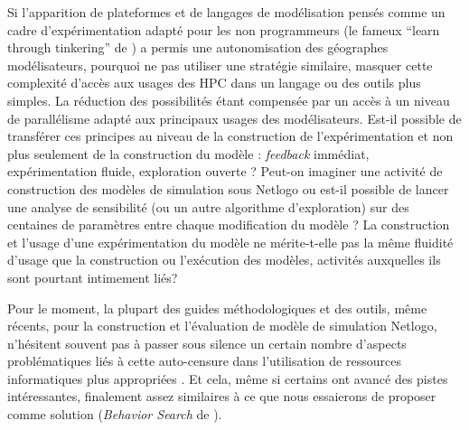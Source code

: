 
Si l'apparition de plateformes et de langages de modélisation pensés comme un cadre d'expérimentation adapté pour les non programmeurs (le fameux \foreignquote{english}{learn through tinkering} de \textcite{Resnick2013}) a permis une autonomisation des géographes modélisateurs, pourquoi ne pas utiliser une stratégie similaire, masquer cette complexité d'accès aux usages des HPC dans un langage ou des outils plus simples. La réduction des possibilités étant  compensée par un accès à un niveau de parallélisme adapté aux principaux usages des modélisateurs. Est-il possible de transférer ces principes au niveau de la construction de l'expérimentation et non plus seulement de la construction du modèle : \textit{feedback} immédiat, expérimentation fluide, exploration ouverte ? Peut-on imaginer une activité de construction des modèles de simulation sous Netlogo ou est-il possible de lancer une analyse de sensibilité (ou un autre algorithme d'exploration) sur des centaines de paramètres entre chaque modification du modèle ? La construction et l'usage d'une expérimentation du modèle ne mérite-t-elle pas la même fluidité d'usage que la construction ou l'exécution des modèles, activités auxquelles ils sont pourtant intimement liés?

Pour le moment, la plupart des guides méthodologiques et des outils, même récents, pour la construction et l'évaluation de modèle de simulation Netlogo, n'hésitent souvent pas à passer sous silence un certain nombre d'aspects problématiques liés à cette auto-censure dans l'utilisation de ressources informatiques plus appropriées \autocites{Gilbert2008, Grimm2011a}. Et cela, même si certains ont avancé des pistes intéressantes, finalement assez similaires à ce que nous essaierons de proposer comme solution (\textit{Behavior Search} de \textcite{Stonedahl2011a}). %

